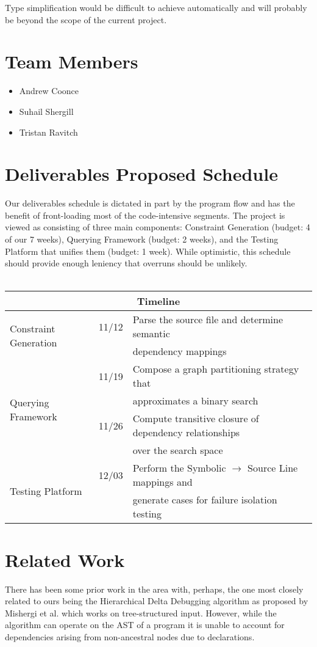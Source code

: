 \documentclass[11pt]{article}
\begin{document}
Type simplification would be difficult to achieve automatically and will
probably be beyond the scope of the current project.


\section{Team Members}
\begin{itemize}
\item{Andrew Coonce}
\item{Suhail Shergill}
\item{Tristan Ravitch}
\end{itemize}

\section{Deliverables Proposed Schedule}
Our deliverables schedule is dictated in part by the program flow and has the
benefit of front-loading most of the code-intensive segments. The project is
viewed as consisting of three main components: Constraint Generation (budget: 4
of our 7 weeks), Querying Framework (budget: 2 weeks), and the Testing Platform
that unifies them (budget: 1 week). While optimistic, this schedule should
provide enough leniency that overruns should be unlikely.  \\ \\
\begin{tabular}{|l|l|l|}
\hline
\multicolumn{3}{|c|}{Timeline} \\
\hline
\multirow{2}{*}{Constraint Generation} & 11/12 &
Parse the source file and determine semantic \\
 & & dependency mappings \\ \hline
\multirow{4}{*}{Querying Framework} & 11/19 & Compose a graph partitioning
strategy that \\
 & & approximates a binary search \\
 & 11/26 & Compute transitive closure of dependency relationships \\
 & & over the search space \\ \hline
\multirow{2}{*}{Testing Platform} & 12/03 & Perform the Symbolic $\rightarrow$
Source Line mappings and \\
 & & generate cases for failure isolation testing \\ \hline
\end{tabular}



\section{Related Work}
There has been some prior work in the area with, perhaps, the one most closely
related to ours being the Hierarchical Delta Debugging algorithm as proposed by
Mishergi et al. \cite{hdd} which works on tree-structured input. However, while
the algorithm can operate on the AST of a program it is unable to account for
dependencies arising from non-ancestral nodes due to declarations.
\end{document}
